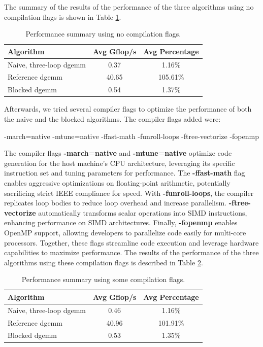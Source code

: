 \documentclass[unicode,11pt,a4paper,oneside,numbers=endperiod,openany]{scrartcl}
\begin{document}
The summary of the results of the performance of the three algorithms using no compilation flags 
is shown in Table \ref{tab:performance_summary_base}.
\begin{table}[htbp]
    \centering
    \caption{Performance summary using no compilation flags.}
    \begin{tabular}{||lcc||}
        \hline
        Algorithm & Avg Gflop/s & Avg Percentage \\
        \hline
        \hline
        Naive, three-loop dgemm & 0.37 & 1.16\% \\
        Reference dgemm & 40.65 & 105.61\% \\
        Blocked dgemm & 0.54 & 1.37\% \\
        \hline
    \end{tabular}\label{tab:performance_summary_base}
\end{table}
Afterwards, we tried several compiler flags to optimize the performance of both the naive and 
the blocked algorithms. The compiler flags added were:
\begin{grayverbatim}
-march=native -mtune=native -ffast-math -funroll-loops -ftree-vectorize -fopenmp
\end{grayverbatim}
The compiler flags \textbf{-march=native} and \textbf{-mtune=native} optimize code generation for the host
machine's CPU architecture, leveraging its specific instruction set and tuning parameters
for performance. The \textbf{-ffast-math} flag enables aggressive optimizations on floating-point
arithmetic, potentially sacrificing strict IEEE compliance for speed. With \textbf{-funroll-loops},
the compiler replicates loop bodies to reduce loop overhead and increase parallelism.
\textbf{-ftree-vectorize} automatically transforms scalar operations into SIMD instructions, enhancing
performance on SIMD architectures. Finally, \textbf{-fopenmp} enables OpenMP support, allowing developers
to parallelize code easily for multi-core processors. Together, these flags streamline code
execution and leverage hardware capabilities to maximize performance.
The results of the performance of the three algorithms using these compilation flags is 
described in Table \ref{tab:performance_summary_some}.
\begin{table}[htbp]
    \centering
    \caption{Performance summary using some compilation flags.}
    \begin{tabular}{||lcc||}
        \hline
        Algorithm & Avg Gflop/s & Avg Percentage \\
        \hline
        \hline
        Naive, three-loop dgemm & 0.46 & 1.16\% \\
        Reference dgemm & 40.96 & 101.91\% \\
        Blocked dgemm & 0.53 & 1.35\% \\
        \hline
    \end{tabular}\label{tab:performance_summary_some}
\end{table}
\end{document}
